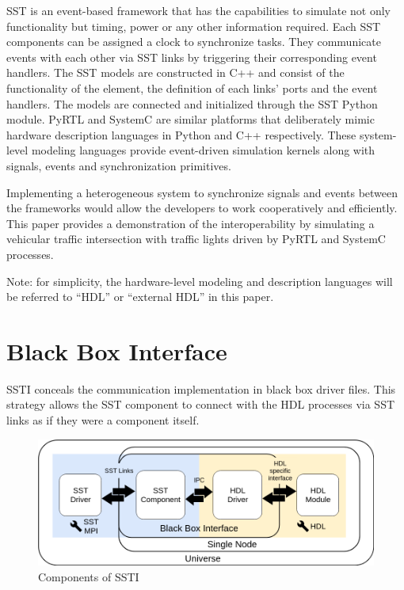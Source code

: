 \documentclass{article}
\begin{document}
  SST is an event-based framework that has the capabilities to simulate not only functionality but
  timing, power or any other information required. Each SST components can be assigned a clock to
  synchronize tasks. They communicate events with each other via SST links by triggering their
  corresponding event handlers. The SST models are constructed in C++ and consist of the
  functionality of the element, the definition of each links' ports and the event handlers. The
  models are connected and initialized through the SST Python module. PyRTL and SystemC are similar
  platforms that deliberately mimic hardware description languages in Python and C++ respectively.
  These system-level modeling languages provide event-driven simulation kernels along with signals,
  events and synchronization primitives.

  Implementing a heterogeneous system to synchronize signals and events between the frameworks would
  allow the developers to work cooperatively and efficiently. This paper provides a demonstration of
  the interoperability by simulating a vehicular traffic intersection with traffic lights driven by
  PyRTL and SystemC processes.

  Note: for simplicity, the hardware-level modeling and description languages will be referred to
  ``HDL'' or ``external HDL'' in this paper.

  \section{Black Box Interface}
  SSTI conceals the communication implementation in black box driver files. This strategy allows the
  SST component to connect with the HDL processes via SST links as if they were a component itself.

  \begin{figure}[!h]
    \centering
    \includegraphics[width=6.5in]{diagrams/comm.png}
    \caption{Components of SSTI}
    \label{fig:comm}
  \end{figure}
\end{document}
